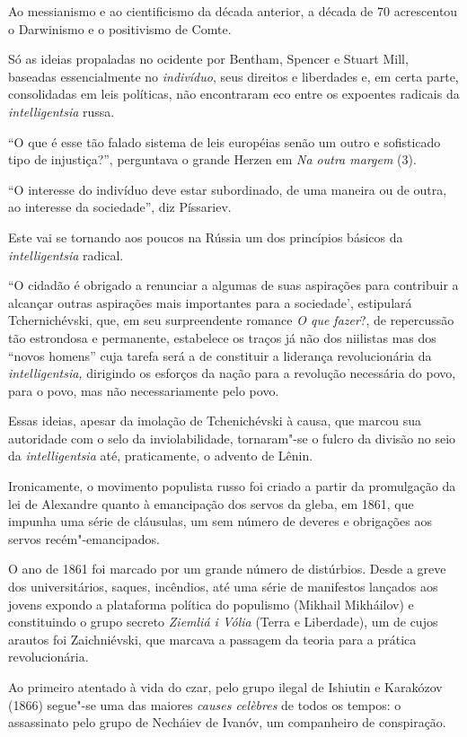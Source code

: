 Ao messianismo e ao cientificismo da década anterior, a década de 70
acrescentou o Darwinismo e o positivismo de Comte.

Só as ideias propaladas no ocidente por Bentham, Spencer e Stuart Mill,
baseadas essencialmente no \emph{indivíduo}, seus direitos e liberdades
e, em certa parte, consolidadas em leis políticas, não encontraram eco
entre os expoentes radicais da \emph{intelligentsia} russa.

``O que é esse tão falado sistema de leis européias senão um outro e
sofisticado tipo de injustiça?'', perguntava o grande Herzen em \emph{Na
outra margem} (3).

``O interesse do indivíduo deve estar subordinado, de uma maneira ou de
outra, ao interesse da sociedade'', diz Píssariev.

Este vai se tornando aos poucos na Rússia um dos princípios básicos da
\emph{intelligentsia} radical.

``O cidadão é obrigado a renunciar a algumas de suas aspirações para
contribuir a alcançar outras aspirações mais importantes para a
sociedade', estipulará Tchernichévski, que, em seu surpreendente romance
\emph{O que fazer}?, de repercussão tão estrondosa e permanente,
estabelece os traços já não dos niilistas mas dos ``novos homens'' cuja
tarefa será a de constituir a liderança revolucionária da
\emph{intelligentsia,} dirigindo os esforços da nação para a revolução
necessária do povo, para o povo, mas não necessariamente pelo povo.

Essas ideias, apesar da imolação de Tchenichévski à causa, que marcou
sua autoridade com o selo da inviolabilidade, tornaram"-se o fulcro da
divisão no seio da \emph{intelligentsia} até, praticamente, o advento de
Lênin.

Ironicamente, o movimento populista russo foi criado a partir da
promulgação da lei de Alexandre  quanto à emancipação dos servos da
gleba, em 1861, que impunha uma série de cláusulas, um sem número de
deveres e obrigações aos servos recém"-emancipados.

O ano de 1861 foi marcado por um grande número de distúrbios. Desde a
greve dos universitários, saques, incêndios, até uma série de manifestos
lançados aos jovens expondo a plataforma política do populismo (Mikhail
Mikháilov) e constituindo o grupo secreto \emph{Ziemliá i Vólia} (Terra
e Liberdade), um de cujos arautos foi Zaichniévski, que marcava a
passagem da teoria para a prática revolucionária.

Ao primeiro atentado à vida do czar, pelo grupo ilegal de Ishiutin e
Karakózov (1866) segue"-se uma das maiores \emph{causes celèbres} de
todos os tempos: o assassinato pelo grupo de Necháiev de Ivanóv, um
companheiro de conspiração.

